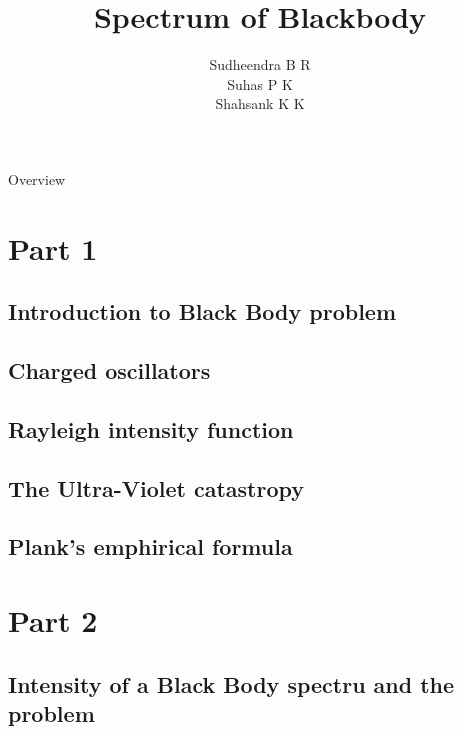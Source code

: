 \documentclass[aspectratio=169]{beamer}
\title{Spectrum of Blackbody}
\institute{Yuvaraja's College, Mysuru}
\author{Sudheendra B R \\ Suhas P K \\ Shahsank K K}
\date{}
\begin{document}
\begin{frame}
\titlepage
\end{frame}

\begin{frame}{Overview}
\tableofcontents
\end{frame}

\section{Part 1}
\subsection{Introduction to Black Body problem} 
\begin{frame}

\end{frame}
 
 
\subsection{Charged oscillators}
\begin{frame}

\end{frame} 
 
\subsection{Rayleigh intensity function}
\begin{frame}

\end{frame}
 
\subsection{The Ultra-Violet catastropy} 
\begin{frame} 

\end{frame}

\subsection{Plank's emphirical formula}

\section{Part 2}
\subsection{Intensity of a Black Body spectru and the problem}
\begin{frame}

\end{frame}
\end{document}
